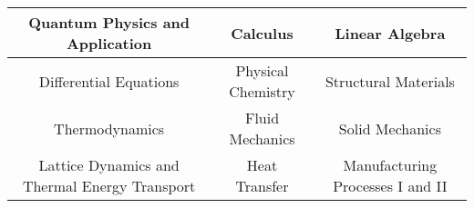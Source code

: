 \begin{center}

    \begin{tabular}{|c|c|c|}
    
    \hline
    Quantum Physics and Application & Calculus & Linear Algebra \\
    \hline
    Differential Equations & Physical Chemistry & Structural Materials           \\
    \hline
    Thermodynamics & Fluid Mechanics & Solid Mechanics \\
    \hline
    Lattice Dynamics and Thermal Energy Transport & Heat Transfer & Manufacturing Processes I and II \\
    \hline
    
    \end{tabular}
    
    \end{center}